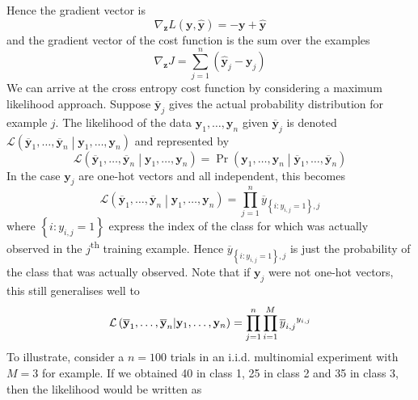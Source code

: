 \documentclass[11pt]{report} %
\begin{document}
Hence the gradient vector is
\begin{equation}
\nabla_{\mathbf{z}}L\left(\mathbf{y}, \hat{\mathbf{y}}\right) = - \mathbf{y} + \hat{\mathbf{y}}
\end{equation}
and the gradient vector of the cost function is the sum over the examples
\begin{equation}
\nabla_{\mathbf{z}} J = \sum_{j = 1}^{n}\left(\hat{\mathbf{y}}_{j} - \mathbf{y}_{j}\right)
\end{equation}
We can arrive at the cross entropy cost function by considering a maximum likelihood approach. Suppose $\bar{\mathbf{y}}_{j}$ gives the actual probability distribution for example $j$. The likelihood of the data $\mathbf{y}_{1}, \dots, \mathbf{y}_{n}$ given $\overline{\mathbf{y}}_{j}$ is denoted $\mathcal{L}\left(\overline{\mathbf{y}}_{1}, \dots, \overline{\mathbf{y}}_{n}\middle|\mathbf{y}_{1}, \dots, \mathbf{y}_{n}\right)$ and represented by
\begin{equation}
\mathcal{L}\left(\overline{\mathbf{y}}_{1}, \dots, \overline{\mathbf{y}}_{n}\middle|\mathbf{y}_{1}, \dots, \mathbf{y}_{n}\right) = \operatorname{Pr}\left(\mathbf{y}_{1}, \dots, \mathbf{y}_{n}\middle|\overline{\mathbf{y}}_{1}, \dots, \overline{\mathbf{y}}_{n}\right)
\end{equation}
In the case $\mathbf{y}_{j}$ are one-hot vectors and all independent, this becomes
\begin{equation}
\mathcal{L}\left(\overline{\mathbf{y}}_{1}, \dots, \overline{\mathbf{y}}_{n}\middle|\mathbf{y}_{1}, \dots, \mathbf{y}_{n}\right) = \prod_{j = 1}^{n}\overline{y}_{\left\{i: y_{i, j} = 1\right\}, j}
\end{equation}
where $\left\{i: y_{i, j} = 1\right\}$ express the index of the class for which was actually observed in the $j$\textsuperscript{th} training example. Hence $\overline{y}_{\left\{i: y_{i, j} = 1\right\}, j}$ is just the probability of the class that was actually observed. Note that if $\mathbf{y}_{j}$ were not one-hot vectors, this still generalises well to
\begin{equation}
\mathcal{L}\left(\overline{\mathbf{y}}_{1}, \dots, \overline{\mathbf{y}}_{n}\middle|\mathbf{y}_{1}, \dots, \mathbf{y}_{n}\right) = \prod_{j = 1}^{n}\prod_{i = 1}^{M}\overline{y}_{i, j}\mathstrut^{y_{i, j}}
\end{equation}
To illustrate, consider a $n = 100$ trials in an i.i.d. multinomial experiment with $M = 3$ for example. If we obtained 40 in class 1, 25 in class 2 and 35 in  class 3, then the likelihood would be written as
\end{document}
